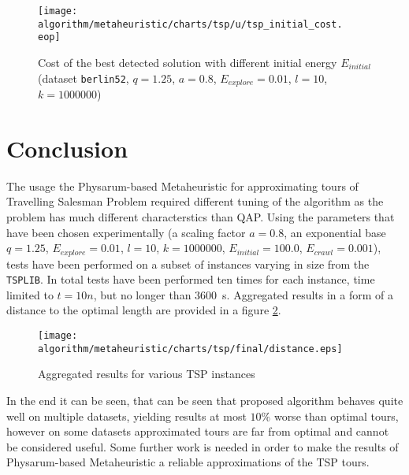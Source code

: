 \begin{figure}
  \centering

  \texttt{[image: algorithm/metaheuristic/charts/tsp/u/tsp\_initial\_cost.\\eop]}

  \caption{Cost of the best detected solution with different initial energy $E_{initial}$ (dataset \texttt{berlin52}, $q=1.25$, $a=0.8$, $E_{explore}=0.01$, $l=10$, $k=1000000$)}
  \label{figure:tsp_initial_cost}
\end{figure}

\section*{Conclusion}

The usage the Physarum-based Metaheuristic for approximating tours of Travelling Salesman Problem required different tuning of the algorithm as the problem has much different characterstics than QAP. Using the parameters that have been chosen experimentally (a scaling factor $a=0.8$, an exponential base $q=1.25$, $E_{explore}=0.01$, $l=10$, $k=1000000$, $E_{initial}=100.0$, $E_{crawl}=0.001$), tests have been performed on a subset of instances varying in size from the \texttt{TSPLIB}. In total tests have been performed ten times for each instance, time limited to $t=10n$, but no longer than 3600~s. Aggregated results in a form of a distance to the optimal length are provided in a figure \ref{figure:tsp_final}.

\begin{figure}
  \centering

  \texttt{[image: algorithm/metaheuristic/charts/tsp/final/distance.eps]}

  \caption{Aggregated results for various TSP instances}
  \label{figure:tsp_final}
\end{figure}

In the end it can be seen, that can be seen that proposed algorithm behaves quite well on multiple datasets, yielding results at most $10\%$ worse than optimal tours, however on some datasets approximated tours are far from optimal and cannot be considered useful. Some further work is needed in order to make the results of Physarum-based Metaheuristic a reliable approximations of the TSP tours.
